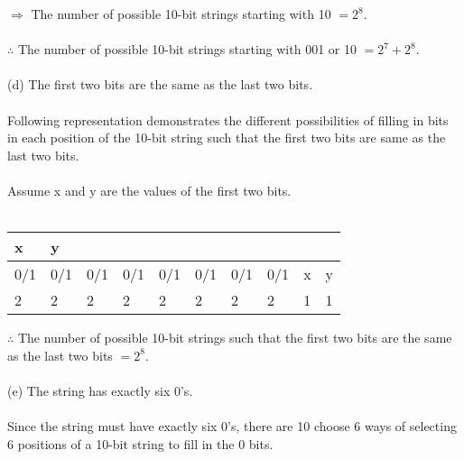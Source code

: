 \documentclass[14pt]{extreport}
\begin{document}
\begin{enumerate}[label=(\alph*)]
$\Rightarrow$ The number of possible 10-bit strings starting with 10 $= 2^{8}.$ \\\\
$\therefore$ The number of possible 10-bit strings starting with 001 or 10 $= 2^{7} + 2^{8}.$ \\\\

(d) The first two bits are the same as the last two bits. \\\\
Following representation demonstrates the different possibilities of filling in bits in each position of the 10-bit string such that the first two bits are same as the last two bits.\\\\
Assume x and y are the values of the first two bits.\\\\

\begin{table}[ht]
\centering
\begin{tabular}{llllllllll}
x                         & y                        &                          &                          &                          &                          &                          &                          &                        &                        \\ \hline
\multicolumn{1}{|l|}{0/1} & \multicolumn{1}{l|}{0/1} & \multicolumn{1}{l|}{0/1} & \multicolumn{1}{l|}{0/1} & \multicolumn{1}{l|}{0/1} & \multicolumn{1}{l|}{0/1} & \multicolumn{1}{l|}{0/1} & \multicolumn{1}{l|}{0/1} & \multicolumn{1}{l|}{x} & \multicolumn{1}{l|}{y} \\ \hline
2                         & 2                        & 2                        & 2                        & 2                        & 2                        & 2                        & 2                        & 1                      & 1                     
\end{tabular}
\end{table}

$\therefore$ The number of possible 10-bit strings such that the first two bits are the same as the last two bits $= 2^{8}.$ \\\\

(e) The string has exactly six 0's. \\\\
Since the string must have exactly six 0's, there are 10 choose 6 ways of selecting 6 positions of a 10-bit string to fill in the 0 bits.\\


\end{enumerate}
\end{document}
